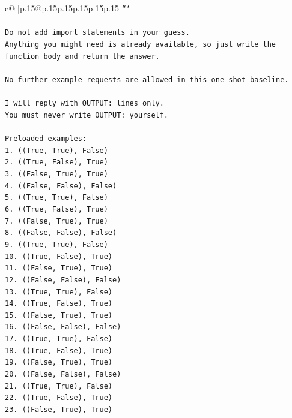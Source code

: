 \documentclass{article}
\begin{document}
{\begin{supertabular}{c@{$\;$}|p{.15\linewidth}@{}p{.15\linewidth}p{.15\linewidth}p{.15\linewidth}p{.15\linewidth}p{.15\linewidth}}
{{{\texttt{```} \\
\\ 
\texttt{Do not add import statements in your guess.} \\
\texttt{Anything you might need is already available, so just write the function body and return the answer.} \\
\\ 
\texttt{No further example requests are allowed in this one{-}shot baseline.} \\
\\ 
\texttt{I will reply with OUTPUT: lines only.} \\
\texttt{You must never write OUTPUT: yourself.} \\
\\ 
\texttt{Preloaded examples:} \\
\texttt{1. ((True, True), False)} \\
\texttt{2. ((True, False), True)} \\
\texttt{3. ((False, True), True)} \\
\texttt{4. ((False, False), False)} \\
\texttt{5. ((True, True), False)} \\
\texttt{6. ((True, False), True)} \\
\texttt{7. ((False, True), True)} \\
\texttt{8. ((False, False), False)} \\
\texttt{9. ((True, True), False)} \\
\texttt{10. ((True, False), True)} \\
\texttt{11. ((False, True), True)} \\
\texttt{12. ((False, False), False)} \\
\texttt{13. ((True, True), False)} \\
\texttt{14. ((True, False), True)} \\
\texttt{15. ((False, True), True)} \\
\texttt{16. ((False, False), False)} \\
\texttt{17. ((True, True), False)} \\
\texttt{18. ((True, False), True)} \\
\texttt{19. ((False, True), True)} \\
\texttt{20. ((False, False), False)} \\
\texttt{21. ((True, True), False)} \\
\texttt{22. ((True, False), True)} \\
\texttt{23. ((False, True), True)} \\
}}}
\end{supertabular}}
\end{document}
